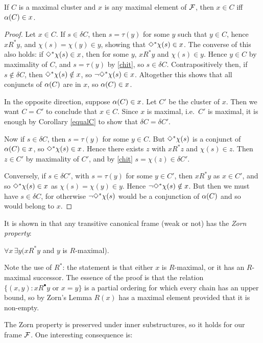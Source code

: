 \begin{lemma} \label{maxdef}
If  $C$ is a maximal cluster and $x$ is any maximal element of $\mathcal{F}$, then $x\in C$ iff $\alpha(C)\in x$.
\end{lemma}
\begin{proof}
Let $x\in C$. If $s\in\delta C$, then $s=\tau(y)$ for some $y$ such that $y\in C$, hence $xR^*y$, and $\chi(s)=\chi(y)\in y$, showing that $\Diamond^*\chi(s)\in x$. The converse of this also holds: if $\Diamond^*\chi(s)\in x$, then for some $y$, $xR^* y$ and $\chi(s)\in y$. Hence $y\in C$ by maximality of $C$, and $s=\tau(y)$ by \eqref{chit}, so $s\in\delta C$.
Contrapositively then, if $s\notin \delta C$, then $\Diamond^*\chi(s)\notin x$, so $\neg\Diamond^*\chi(s)\in x$. 
Altogether this shows that all conjuncts of $\alpha(C)$ are in $x$, so $\alpha(C)\in x$.

In the opposite direction, suppose $\alpha(C)\in x$. Let $C'$ be the cluster of $x$. Then we want $C=C'$ to conclude that $x\in C$. Since $x$ is maximal, i.e.\ $C'$ is maximal, it is enough by Corollary \ref{equalC} to show that $\delta C=\delta C'$.

Now if $s\in\delta C$, then $s=\tau(y)$ for some $y\in C$. But $\Diamond^*\chi(s)$ is a conjunct of $\alpha(C)\in x$, so $\Diamond^*\chi(s)\in x$.
Hence there exists $z$ with $xR^*z$ and $\chi(s)\in z$. Then $z\in C'$ by maximality of $C'$, and  by \eqref{chit} $s=\chi(z)\in \delta C'$.

Conversely, if $s\in\delta C'$, with  $s=\tau(y)$ for some $y\in C'$, then $xR^* y$ as $x\in C'$, and so 
$\Diamond^*\chi(s)\in x$ as $\chi(s)=\chi(y)\in y$. Hence $\neg\Diamond^*\chi(s)\notin x$.
But then we must have $s\in\delta C$, for otherwise $\neg\Diamond^*\chi(s)$ would be a conjunction of $\alpha(C)$ and so would belong to $x$.
\end{proof}

It is shown in \cite{Sheh:d90} that any transitive canonical frame (weak or not) has the \emph{Zorn property}:
\begin{center}
$\forall x\,\exists y (xR^*y$ and  $y$ is $R$-maximal).
\end{center}
Note the use of $R^*$: the statement is that either $x$ is $R$-maximal, or it has an $R$-maximal successor. 
The essence of the proof is that the relation
$\{(x,y): xR^\bullet y \text{ or }x= y\}$
is a partial ordering for which every chain has an upper bound, so by Zorn's Lemma $R(x)$ has a maximal element provided that it is non-empty.

The Zorn property is preserved under inner substructures, so it holds for our frame $\mathcal{F}$. One interesting consequence is:

